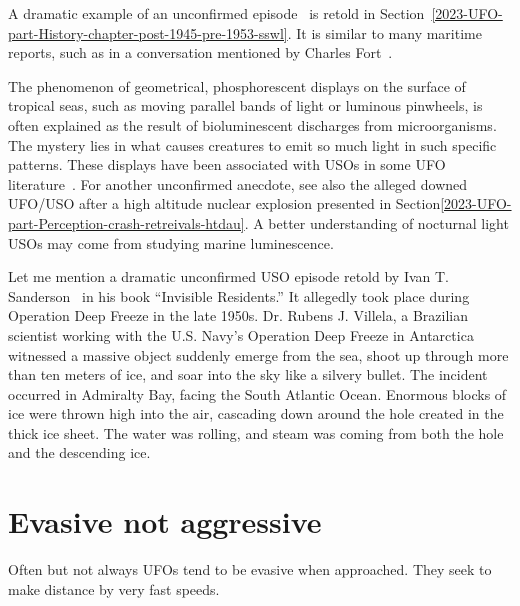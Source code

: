 A dramatic example of an unconfirmed episode~\cite{Brodler1952} is retold in Section~\ref{2023-UFO-part-History-chapter-post-1945-pre-1953-sswl}. It is similar to many maritime reports, such as in a conversation mentioned by Charles Fort~\cite[Chapter~21]{FortBotD}.

The phenomenon of geometrical, phosphorescent displays on the surface of tropical seas, such as moving parallel bands of light or luminous pinwheels, is often explained as the result of bioluminescent discharges from microorganisms. The mystery lies in what causes creatures to emit so much light in such specific patterns. These displays have been associated with USOs in some UFO literature~\cite[Chapter27]{Eberhart-I-1986Jan}. For another unconfirmed anecdote, see also the alleged downed UFO/USO after a high altitude nuclear explosion presented in Section\ref{2023-UFO-part-Perception-crash-retreivals-htdau}. A better understanding of nocturnal light USOs may come from studying marine luminescence.

Let me mention a dramatic unconfirmed USO episode retold by Ivan T. Sanderson~\cite[Chapter~1]{Sanderson-invisibeRes} in his book ``Invisible Residents.'' It allegedly took place during Operation Deep Freeze in the late 1950s. Dr. Rubens J. Villela, a Brazilian scientist working with the U.S. Navy's Operation Deep Freeze in Antarctica witnessed a massive object suddenly emerge from the sea, shoot up through more than ten meters of ice, and soar into the sky like a silvery bullet. The incident occurred in Admiralty Bay, facing the South Atlantic Ocean. Enormous blocks of ice were thrown high into the air, cascading down around the hole created in the thick ice sheet. The water was rolling, and steam was coming from both the hole and the descending ice.


\section{Evasive not aggressive}

Often but not always UFOs tend to be evasive when approached. They seek to make distance by very fast speeds.

